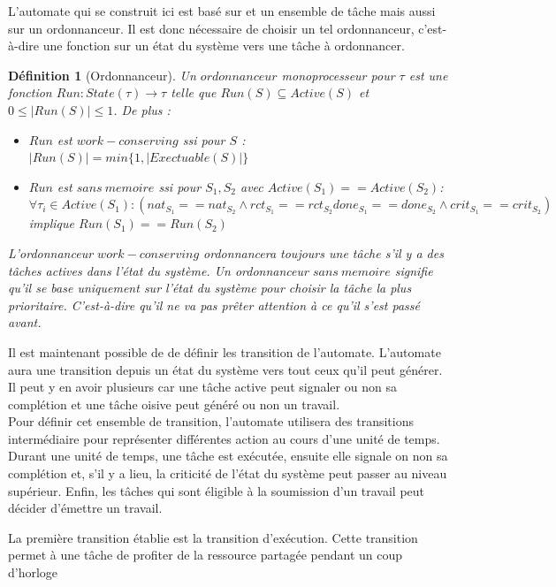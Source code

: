\documentclass[12pt,a4paper,oneside]{book}
\theoremstyle{break}
\newtheorem{defin}{Définition}[chapter]
\theoremstyle{breakplain}
\begin{document}
L’automate qui se construit ici est basé sur et un ensemble de tâche mais aussi sur un ordonnanceur. Il est donc nécessaire de choisir un tel ordonnanceur, c’est-à-dire une fonction sur un état du système vers une tâche à ordonnancer.

\begin{defin}[Ordonnanceur]
\label{spo:run}
Un $ordonnanceur$ monoprocesseur pour $\tau$ est une fonction $Run : State(\tau) \rightarrow \tau$ telle que $Run(S) \subseteq Active(S)$ et $0 \leq |Run(S)| \leq 1$.
De plus :
\begin{itemize}
\item $Run$ est $work-conserving$ ssi pour $S$ : $ |Run(S)| = min\{1, |Exectuable(S)|\}$
\item $Run$ est $sans\ memoire$ ssi pour $S_1,S_2$ avec $Active(S_1) == Active(S_2)$:
$\forall \tau_i \in Active(S_1) : (nat_{S_1} == nat_{S_2} \wedge rct_{S_1} == rct_{S_2} done_{S_1} == done_{S_2} \wedge crit_{S_1} == crit_{S_2} )$ implique $Run(S_1) == Run(S_2)$
\end{itemize}

L'ordonnanceur $work-conserving$ ordonnancera toujours une tâche s'il y a des tâches actives dans l'état du système. Un ordonnanceur $sans\ memoire$ signifie qu'il se base uniquement sur l'état du système pour choisir la tâche la plus prioritaire. C'est-à-dire qu'il ne va pas prêter attention à ce qu'il s'est passé avant.

\end{defin}

Il est maintenant possible de de définir les transition de l'automate. L'automate aura une transition depuis un état du système vers tout ceux qu'il peut générer. Il peut y en avoir plusieurs car une tâche active peut signaler ou non sa complétion et une tâche oisive peut généré ou non un travail.\\
Pour définir cet ensemble de transition, l'automate utilisera des transitions intermédiaire pour représenter différentes action au cours d'une unité de temps.\\

Durant une unité de temps, une tâche est exécutée, ensuite elle signale on non sa complétion et, s'il y a lieu, la criticité de l'état du système peut passer au niveau supérieur. Enfin, les tâches qui sont éligible à la soumission d'un travail peut décider d'émettre un travail.

La première transition établie est la transition d'exécution. Cette transition permet à une tâche de profiter de la ressource partagée pendant un coup d'horloge
\end{document}
